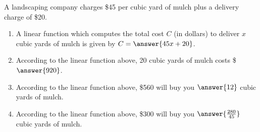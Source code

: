 \documentclass{ximera}
\author{Kenneth Berglund}
\begin{document}
\begin{exercise}
\licenseSZ

A landscaping company charges \$45 per cubic yard of mulch plus a delivery charge of \$20.


\begin{enumerate}
\item A linear function which computes the total cost $C$ (in dollars) to deliver $x$ cubic yards of mulch is given by $C = \answer{45x + 20}$.

\item According to the linear function above, 20 cubic yards of mulch costs \$$\answer{920}$.

\item According to the linear function above, \$560 will buy you $\answer{12}$ cubic yards of mulch. 

\item According to the linear function above, \$300 will buy you $\answer{\frac{280}{45}}$ cubic yards of mulch. 
	
\end{enumerate}

\end{exercise}
\end{document}
